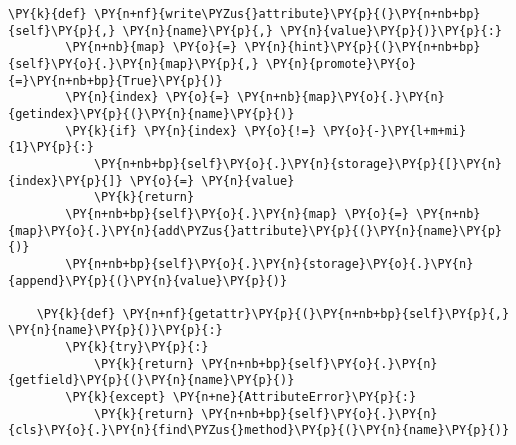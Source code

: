 \begin{Verbatim}[commandchars=\\\{\}]
    \PY{k}{def} \PY{n+nf}{write\PYZus{}attribute}\PY{p}{(}\PY{n+nb+bp}{self}\PY{p}{,} \PY{n}{name}\PY{p}{,} \PY{n}{value}\PY{p}{)}\PY{p}{:}
        \PY{n+nb}{map} \PY{o}{=} \PY{n}{hint}\PY{p}{(}\PY{n+nb+bp}{self}\PY{o}{.}\PY{n}{map}\PY{p}{,} \PY{n}{promote}\PY{o}{=}\PY{n+nb+bp}{True}\PY{p}{)}
        \PY{n}{index} \PY{o}{=} \PY{n+nb}{map}\PY{o}{.}\PY{n}{getindex}\PY{p}{(}\PY{n}{name}\PY{p}{)}
        \PY{k}{if} \PY{n}{index} \PY{o}{!=} \PY{o}{-}\PY{l+m+mi}{1}\PY{p}{:}
            \PY{n+nb+bp}{self}\PY{o}{.}\PY{n}{storage}\PY{p}{[}\PY{n}{index}\PY{p}{]} \PY{o}{=} \PY{n}{value}
            \PY{k}{return}
        \PY{n+nb+bp}{self}\PY{o}{.}\PY{n}{map} \PY{o}{=} \PY{n+nb}{map}\PY{o}{.}\PY{n}{add\PYZus{}attribute}\PY{p}{(}\PY{n}{name}\PY{p}{)}
        \PY{n+nb+bp}{self}\PY{o}{.}\PY{n}{storage}\PY{o}{.}\PY{n}{append}\PY{p}{(}\PY{n}{value}\PY{p}{)}

    \PY{k}{def} \PY{n+nf}{getattr}\PY{p}{(}\PY{n+nb+bp}{self}\PY{p}{,} \PY{n}{name}\PY{p}{)}\PY{p}{:}
        \PY{k}{try}\PY{p}{:}
            \PY{k}{return} \PY{n+nb+bp}{self}\PY{o}{.}\PY{n}{getfield}\PY{p}{(}\PY{n}{name}\PY{p}{)}
        \PY{k}{except} \PY{n+ne}{AttributeError}\PY{p}{:}
            \PY{k}{return} \PY{n+nb+bp}{self}\PY{o}{.}\PY{n}{cls}\PY{o}{.}\PY{n}{find\PYZus{}method}\PY{p}{(}\PY{n}{name}\PY{p}{)}
\end{Verbatim}
